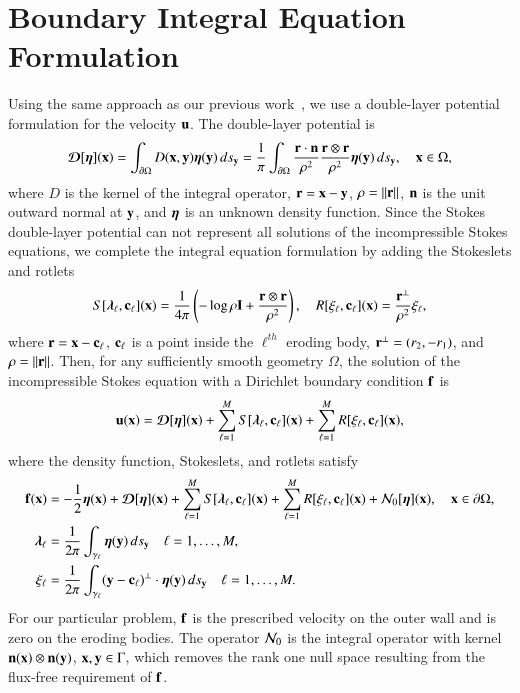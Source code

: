\documentclass[preprint, 10pt]{elsarticle}
\begin{document}
\section{Boundary Integral Equation Formulation}
Using the same approach as
our previous work~\cite{qua-moo2018}, we use a double-layer potential
formulation for the velocity ${\mathbf{u}}$.  The double-layer potential is
\begin{align}
  {\boldsymbol{\mathcal D}}[{\boldsymbol\eta}]({\mathbf{x}}) = \int_{{\partial}\Omega} D({\mathbf{x}},{\mathbf{y}}) {\boldsymbol\eta}({\mathbf{y}})\, ds_{\mathbf{y}} = 
  \frac{1}{\pi}\int_{{\partial}\Omega} 
    \frac{{\mathbf{r}} \cdot {\mathbf{n}}}{\rho^2} \frac{{\mathbf{r}} \otimes {\mathbf{r}}}{\rho^2}
    {\boldsymbol\eta}({\mathbf{y}}) \, ds_{\mathbf{y}}, \quad {\mathbf{x}} \in \Omega,
  \label{eqn:stokesDLP}
\end{align}
where $D$ is the kernel of the integral operator, ${\mathbf{r}} = {\mathbf{x}} - {\mathbf{y}}$,
$\rho = \|{\mathbf{r}}\|$, ${\mathbf{n}}$ is the unit outward normal at ${\mathbf{y}}$, and ${\boldsymbol\eta}$
is an unknown density function.  Since the Stokes double-layer potential
can not represent all solutions of the incompressible Stokes equations,
we complete the integral equation formulation by adding the Stokeslets
and rotlets~\cite{pow-mir1987}
\begin{align}
  S[{\boldsymbol\lambda}_\ell,{\mathbf{c}}_\ell]({\mathbf{x}}) = \frac{1}{4\pi} \left( 
    -\log \rho {\mathbf{I}} + \frac{{\mathbf{r}} \otimes {\mathbf{r}}}{\rho^2} \right), \quad
  R[\xi_\ell,{\mathbf{c}}_\ell]({\mathbf{x}}) = \frac{{\mathbf{r}}^\perp}{\rho^2} \xi_\ell,
\end{align}
where ${\mathbf{r}} = {\mathbf{x}} - {\mathbf{c}}_\ell$, ${\mathbf{c}}_\ell$ is a point inside the
$\ell^{th}$ eroding body, ${\mathbf{r}}^\perp = (r_2,-r_1)$, and $\rho =
\|{\mathbf{r}}\|$.  Then, for any sufficiently smooth geometry $\Omega$, the
solution of the incompressible Stokes equation with a Dirichlet boundary
condition ${\mathbf{f}}$ is
\begin{align}
  {\mathbf{u}}({\mathbf{x}}) = {\boldsymbol{\mathcal D}}[{\boldsymbol\eta}]({\mathbf{x}}) + 
    \sum_{\ell=1}^M S[{\boldsymbol\lambda}_\ell,{\mathbf{c}}_\ell]({\mathbf{x}}) + 
    \sum_{\ell=1}^M R[\xi_\ell,{\mathbf{c}}_\ell]({\mathbf{x}}),
\end{align}
where the density function, Stokeslets, and rotlets satisfy
\begin{align}
  {\mathbf{f}}({\mathbf{x}}) &= -\frac{1}{2}{\boldsymbol\eta}({\mathbf{x}}) + {\boldsymbol{\mathcal D}}[{\boldsymbol\eta}]({\mathbf{x}}) + 
    \sum_{\ell=1}^M S[{\boldsymbol\lambda}_\ell,{\mathbf{c}}_\ell]({\mathbf{x}}) + 
    \sum_{\ell=1}^M R[\xi_\ell,{\mathbf{c}}_\ell]({\mathbf{x}}) +
    {\mathcal{N}}_0[{\boldsymbol\eta}]({\mathbf{x}}), \quad {\mathbf{x}} \in {\partial}\Omega, \\
  {\boldsymbol\lambda}_\ell &= \frac{1}{2\pi} \int_{\gamma_\ell} 
    {\boldsymbol\eta}({\mathbf{y}})\, ds_{\mathbf{y}} \quad \ell = 1,\ldots,M, \\
  \xi_\ell &= \frac{1}{2\pi} \int_{\gamma_\ell}
    ({\mathbf{y}} - {\mathbf{c}}_\ell)^\perp \cdot {\boldsymbol\eta}({\mathbf{y}})\, ds_{\mathbf{y}} 
    \quad \ell = 1,\ldots,M.
\end{align}
For our particular problem, ${\mathbf{f}}$ is the prescribed velocity on the
outer wall and is zero on the eroding bodies.  The operator ${\mathcal{N}}_0$ is
the integral operator with kernel ${\mathbf{n}}({\mathbf{x}}) \otimes {\mathbf{n}}({\mathbf{y}})$, ${\mathbf{x}},{\mathbf{y}}
\in \Gamma$, which removes the rank one null space resulting from the
flux-free requirement of ${\mathbf{f}}$.
\end{document}
